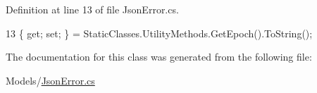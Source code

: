 Definition at line 13 of file Json\+Error.\+cs.


\begin{DoxyCode}
13 \{ \textcolor{keyword}{get}; \textcolor{keyword}{set}; \} = StaticClasses.UtilityMethods.GetEpoch().ToString();
\end{DoxyCode}


The documentation for this class was generated from the following file\+:\begin{DoxyCompactItemize}
\item 
Models/\mbox{\hyperlink{_json_error_8cs}{Json\+Error.\+cs}}\end{DoxyCompactItemize}
